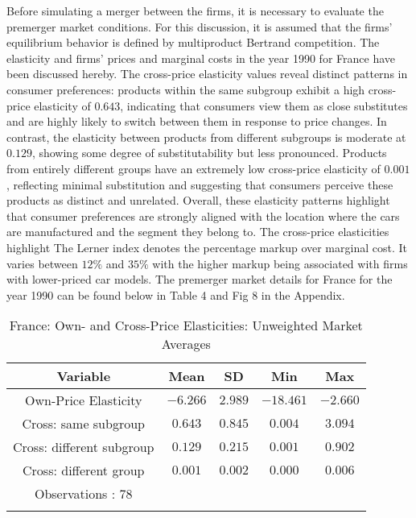 \documentclass[a4paper,11pt]{article}
\begin{document}
    Before simulating a merger between the firms, it is necessary to evaluate the premerger market conditions. For this discussion, it is assumed that the firms' equilibrium behavior is defined by multiproduct Bertrand competition. The elasticity and firms' prices and marginal costs in the year 1990 for France have been discussed hereby. The cross-price elasticity values reveal distinct patterns in consumer preferences: products within the same subgroup exhibit a high cross-price elasticity of $0.643$, indicating that consumers view them as close substitutes and are highly likely to switch between them in response to price changes. In contrast, the elasticity between products from different subgroups is moderate at $0.129$, showing some degree of substitutability but less pronounced. Products from entirely different groups have an extremely low cross-price elasticity of $0.001$, reflecting minimal substitution and suggesting that consumers perceive these products as distinct and unrelated. Overall, these elasticity patterns highlight that consumer preferences are strongly aligned with the location where the cars are manufactured and the segment they belong to. The cross-price elasticities highlight The Lerner index denotes the percentage markup over marginal cost. It varies between $12\%$ and $35\%$ with the higher markup being associated with firms with lower-priced car models. The premerger market details for France for the year 1990 can be found below in Table 4 and Fig 8 in the Appendix.\\

    \begin{table}[h]
        \caption{France: Own- and Cross-Price Elasticities:  Unweighted Market Averages}
        \centering
        \begin{tabular}{ccccc}\\
            \hline
            Variable & Mean & SD & Min & Max\\ 
            \hline
            Own-Price Elasticity           & $-6.266$ & $2.989$ & $-18.461$ & $-2.660$\\
            Cross: same subgroup           & $0.643$  & $0.845$ & $0.004$ & $3.094$\\
            Cross: different subgroup      & $ 0.129$  & $0.215$ & $0.001$ & $0.902$\\
            Cross: different group         & $0.001$  & $0.002$ & $0.000$ & $0.006$\\
            \hline
            Observations : $78$\\
            \hline\\
        \end{tabular}
        \label{tab: France: Elasticity} 
    \end{table}
\end{document}

